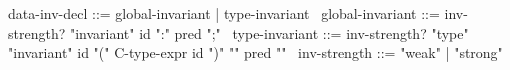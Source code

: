 \begin{syntax}
  data-inv-decl ::= global-invariant | type-invariant
  \
  global-invariant ::= inv-strength? "invariant" id ":" pred ";"
  \
  type-invariant ::= inv-strength? "type" "invariant" id "(" C-type-expr id ")" "{" pred "}"
  \
  inv-strength ::= "weak" | "strong"
\end{syntax}